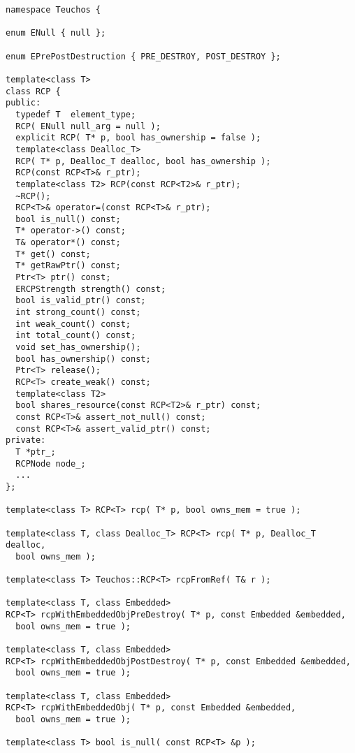 \documentclass[pdf,ps2pdf,11pt]{SANDreport}
\begin{document}
{\scriptsize\begin{verbatim}
namespace Teuchos {

enum ENull { null };

enum EPrePostDestruction { PRE_DESTROY, POST_DESTROY };

template<class T>
class RCP {
public:
  typedef T  element_type;
  RCP( ENull null_arg = null );
  explicit RCP( T* p, bool has_ownership = false );
  template<class Dealloc_T>
  RCP( T* p, Dealloc_T dealloc, bool has_ownership );
  RCP(const RCP<T>& r_ptr);
  template<class T2> RCP(const RCP<T2>& r_ptr);
  ~RCP();
  RCP<T>& operator=(const RCP<T>& r_ptr);
  bool is_null() const;
  T* operator->() const;
  T& operator*() const;
  T* get() const;
  T* getRawPtr() const;
  Ptr<T> ptr() const;
  ERCPStrength strength() const;
  bool is_valid_ptr() const;
  int strong_count() const;
  int weak_count() const;
  int total_count() const;
  void set_has_ownership();
  bool has_ownership() const;
  Ptr<T> release();
  RCP<T> create_weak() const;
  template<class T2>
  bool shares_resource(const RCP<T2>& r_ptr) const;
  const RCP<T>& assert_not_null() const;
  const RCP<T>& assert_valid_ptr() const;
private:
  T *ptr_;
  RCPNode node_;
  ...
};

template<class T> RCP<T> rcp( T* p, bool owns_mem = true );

template<class T, class Dealloc_T> RCP<T> rcp( T* p, Dealloc_T dealloc,
  bool owns_mem );

template<class T> Teuchos::RCP<T> rcpFromRef( T& r );

template<class T, class Embedded>
RCP<T> rcpWithEmbeddedObjPreDestroy( T* p, const Embedded &embedded,
  bool owns_mem = true );

template<class T, class Embedded>
RCP<T> rcpWithEmbeddedObjPostDestroy( T* p, const Embedded &embedded,
  bool owns_mem = true );

template<class T, class Embedded>
RCP<T> rcpWithEmbeddedObj( T* p, const Embedded &embedded,
  bool owns_mem = true );

template<class T> bool is_null( const RCP<T> &p );
\end{verbatim}}
\pagebreak
\end{document}
